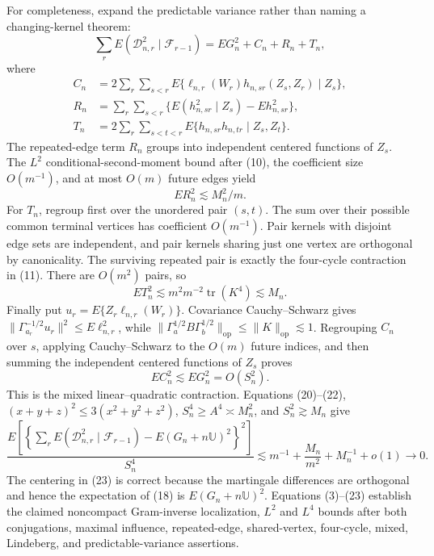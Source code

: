 For completeness, expand the predictable variance rather than naming a changing-kernel theorem:
\[
\sum_rE(\mathcal D_{n,r}^2\mid\mathcal F_{r-1})
=EG_n^2+C_n+R_n+T_n,
\tag{18}
\]
where
\[
\begin{split}
C_n&=2\sum_r\sum_{s<r}E\{\ell_{n,r}(W_r)h_{n,sr}(Z_s,Z_r)\mid Z_s\},\\
R_n&=\sum_r\sum_{s<r}\{E(h_{n,sr}^2\mid Z_s)-Eh_{n,sr}^2\},\\
T_n&=2\sum_r\sum_{s<t<r}E\{h_{n,sr}h_{n,tr}\mid Z_s,Z_t\}.
\end{split}
\tag{19}
\]
The repeated-edge term \(R_n\) groups into independent centered functions of \(Z_s\).  The \(L^2\) conditional-second-moment bound after (10), the coefficient size \(O(m^{-1})\), and at most \(O(m)\) future edges yield
\[
ER_n^2\lesssim M_n^2/m.
\tag{20}
\]
For \(T_n\), regroup first over the unordered pair \((s,t)\).  The sum over their possible common terminal vertices has coefficient \(O(m^{-1})\).  Pair kernels with disjoint edge sets are independent, and pair kernels sharing just one vertex are orthogonal by canonicality.  The surviving repeated pair is exactly the four-cycle contraction in (11).  There are \(O(m^2)\) pairs, so
\[
ET_n^2\lesssim m^2m^{-2}\operatorname{tr}(K^4)\lesssim M_n.
\tag{21}
\]
Finally put \(u_r=E\{Z_r\ell_{n,r}(W_r)\}\).  Covariance Cauchy--Schwarz gives
\(\|\Gamma_{a_r}^{-1/2}u_r\|^2\le E\ell_{n,r}^2\), while
\(\|\Gamma_a^{1/2}B\Gamma_b^{1/2}\|_{\mathrm{op}}\le\|K\|_{\mathrm{op}}\lesssim1\).  Regrouping \(C_n\) over \(s\), applying Cauchy--Schwarz to the \(O(m)\) future indices, and then summing the independent centered functions of \(Z_s\) proves
\[
EC_n^2\lesssim EG_n^2=O(S_n^2).
\tag{22}
\]
This is the mixed linear--quadratic contraction.  Equations (20)--(22), \((x+y+z)^2\le3(x^2+y^2+z^2)\), \(S_n^4\ge A^4\asymp M_n^2\), and \(S_n^2\gtrsim M_n\) give
\[
\frac{E\left[\left\{\sum_rE(\mathcal D_{n,r}^2\mid\mathcal F_{r-1})
-E(G_n+n\mathbb U)^2\right\}^2\right]}{S_n^4}
\lesssim m^{-1}+\frac{M_n}{m^2}+M_n^{-1}+o(1)\longrightarrow0.
\tag{23}
\]
The centering in (23) is correct because the martingale differences are orthogonal and hence the expectation of (18) is \(E(G_n+n\mathbb U)^2\).  Equations (3)--(23) establish the claimed noncompact Gram-inverse localization, \(L^2\) and \(L^4\) bounds after both conjugations, maximal influence, repeated-edge, shared-vertex, four-cycle, mixed, Lindeberg, and predictable-variance assertions.